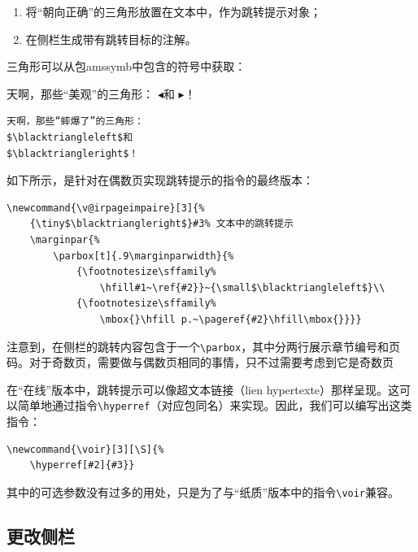 \begin{enumerate}
    \item 将“朝向正确”的三角形放置在文本中，作为跳转提示对象；
    \item 在侧栏生成带有跳转目标的注解。
\end{enumerate}

三角形可以从包\textsf{amssymb}中包含的符号中获取：

\begin{codelist}[11.4]{
    天啊，那些“美观”的三角形：
$\blacktriangleleft$和
$\blacktriangleright$！
}\begin{verbatim}
天啊，那些“蟀爆了”的三角形：
$\blacktriangleleft$和
$\blacktriangleright$！
\end{verbatim}
\end{codelist}

如下所示，是针对在偶数页实现跳转提示的指令的最终版本：

\begin{dmd}
\begin{verbatim}
\newcommand{\v@irpageimpaire}[3]{% 
    {\tiny$\blacktriangleright$}#3% 文本中的跳转提示
    \marginpar{%
        \parbox[t]{.9\marginparwidth}{% 
            {\footnotesize\sffamily%
                \hfill#1~\ref{#2}}~{\small$\blacktriangleleft$}\\
            {\footnotesize\sffamily%
                \mbox{}\hfill p.~\pageref{#2}\hfill\mbox{}}}}
\end{verbatim}
\end{dmd}%

注意到，在侧栏的跳转内容包含于一个\verb|\parbox|，其中分两行展示章节编号和页码。对于奇数页，需要做与偶数页相同的事情，只不过需要考虑到它是奇数页\dm{:-)}

在“在线”版本中，跳转提示可以像超文本链接（lien hypertexte）那样呈现。这可以简单地通过指令\verb|\hyperref|（对应包同名）来实现。因此，我们可以编写出这类指令：

\begin{dmd}
\begin{verbatim}
\newcommand{\voir}[3][\S]{% 
    \hyperref[#2]{#3}}
\end{verbatim}
\end{dmd}

其中的可选参数没有过多的用处，只是为了与“纸质”版本中的指令\verb+\voir+兼容。

\subsection{更改侧栏}

